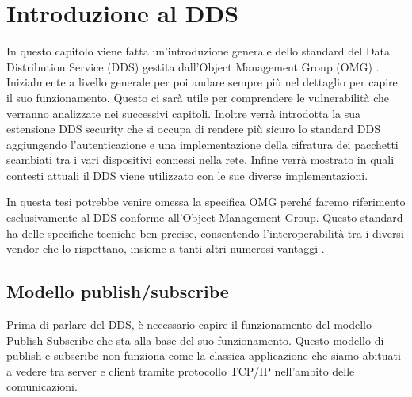 \chapter{Introduzione al DDS}
In questo capitolo viene fatta un'introduzione generale dello 
standard del Data Distribution Service (DDS) gestita
dall'Object Management Group (OMG) \cite{8469351}. 
Inizialmente a livello generale 
per poi andare sempre più nel
dettaglio per capire il suo funzionamento. Questo ci sarà utile 
per comprendere le vulnerabilità che verranno analizzate nei
successivi capitoli. Inoltre verrà introdotta la sua estensione 
DDS security che si occupa di rendere più sicuro lo standard DDS 
aggiungendo l'autenticazione e una 
implementazione della cifratura dei pacchetti scambiati tra i vari
dispositivi connessi nella rete. 
Infine verrà mostrato in quali contesti attuali il DDS viene
utilizzato con le sue diverse implementazioni.

In questa tesi potrebbe venire omessa la specifica OMG perché 
faremo riferimento
esclusivamente al DDS conforme all'Object Management Group. Questo 
standard ha delle specifiche tecniche ben precise, consentendo
l'interoperabilità tra i diversi vendor che lo rispettano, insieme
a tanti altri numerosi vantaggi \cite{dds1.4}.


\section{Modello publish/subscribe}
Prima di parlare del DDS, è necessario capire il 
funzionamento del modello Publish-Subscribe 
che sta alla base del suo funzionamento.
Questo modello di publish e subscribe non funziona come la 
classica applicazione che siamo abituati a vedere tra server e
client tramite protocollo TCP/IP nell'ambito delle comunicazioni. 



